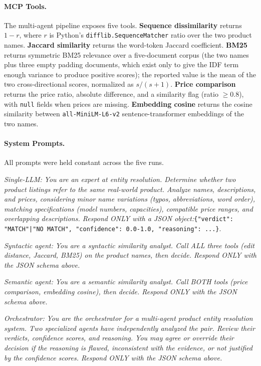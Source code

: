 \documentclass[sigconf]{acmart}
\begin{document}
\paragraph{MCP Tools.}
The multi-agent pipeline exposes five tools. \textbf{Sequence dissimilarity} returns $1-r$, where $r$ is Python's \texttt{difflib.SequenceMatcher} ratio over the two product names. \textbf{Jaccard similarity} returns the word-token Jaccard coefficient. \textbf{BM25} returns symmetric BM25 relevance over a five-document corpus (the two names plus three empty padding documents, which exist only to give the IDF term enough variance to produce positive scores); the reported value is the mean of the two cross-directional scores, normalized as $s/(s+1)$. \textbf{Price comparison} returns the price ratio, absolute difference, and a similarity flag (ratio $\geq 0.8$), with \texttt{null} fields when prices are missing. \textbf{Embedding cosine} returns the cosine similarity between \texttt{all-MiniLM-L6-v2} sentence-transformer embeddings of the two names.

\paragraph{System Prompts.}
\label{sec:prompts}
All prompts were held constant across the five runs.

\noindent\textit{Single-LLM:} \textit{You are an expert at entity resolution. Determine whether two product listings refer to the same real-world product. Analyze names, descriptions, and prices, considering minor name variations (typos, abbreviations, word order), matching specifications (model numbers, capacities), compatible price ranges, and overlapping descriptions. Respond ONLY with a JSON object:}\newline \texttt{\{"verdict": "MATCH"|"NO MATCH", "confidence": 0.0-1.0, "reasoning": ...\}}.

\noindent\textit{Syntactic agent:} \textit{You are a syntactic similarity analyst. Call ALL three tools (edit distance, Jaccard, BM25) on the product names, then decide. Respond ONLY with the JSON schema above.}

\noindent\textit{Semantic agent:} \textit{You are a semantic similarity analyst. Call BOTH tools (price comparison, embedding cosine), then decide. Respond ONLY with the JSON schema above.}

\noindent\textit{Orchestrator:} \textit{You are the orchestrator for a multi-agent product entity resolution system. Two specialized agents have independently analyzed the pair. Review their verdicts, confidence scores, and reasoning. You may agree or override their decision if the reasoning is flawed, inconsistent with the evidence, or not justified by the confidence scores. Respond ONLY with the JSON schema above.}
\end{document}
